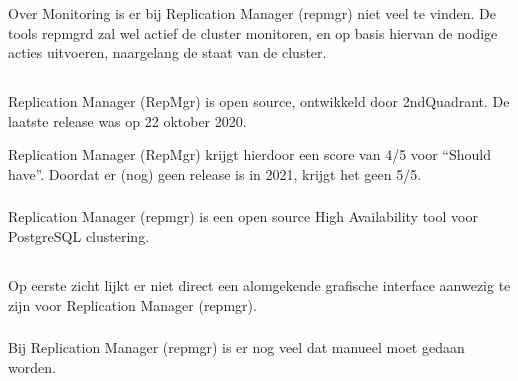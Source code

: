 \subsubsection{}
\label{subsubsec:Monitoring}

Over Monitoring is er bij Replication Manager (repmgr) niet veel te vinden. De tools repmgrd zal wel actief de cluster monitoren, en op basis hiervan de nodige acties uitvoeren, naargelang de staat van de cluster.

\subsection{}
\label{subsec:Should have}

Replication Manager (RepMgr) is open source, ontwikkeld door 2ndQuadrant.
De laatste release was op 22 oktober 2020.

Replication Manager (RepMgr) krijgt hierdoor een score van 4/5 voor “Should have”. Doordat er (nog) geen release is in 2021, krijgt het geen 5/5.

\subsubsection{}
\label{subsubsec:Actieve ondersteuning in 2020-2021}

\subsubsection{}
\label{subsubsec:Open source}

Replication Manager (repmgr) is een open source High Availability tool voor PostgreSQL clustering.

\subsection{}
\label{subsec:Could have}

\subsubsection{}
\label{subsubsec:Grafische interface}

Op eerste zicht lijkt er niet direct een alomgekende grafische interface aanwezig te zijn voor Replication Manager (repmgr).

\subsubsection{}
\label{subsubsec:Beperkte manuele interventie}

Bij Replication Manager (repmgr) is er nog veel dat manueel moet gedaan worden.